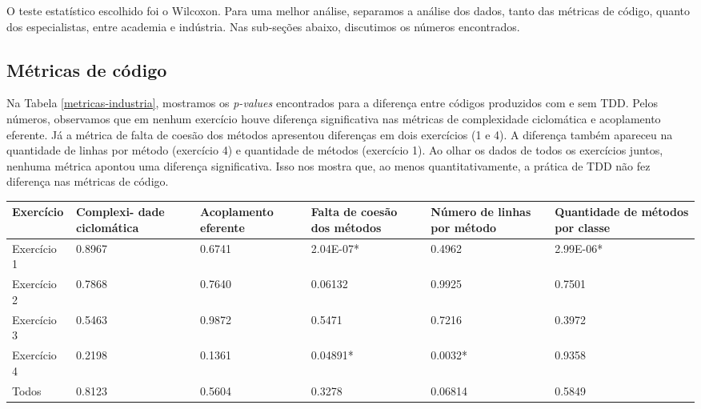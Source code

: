 \documentclass[conference]{IEEEtran}
\begin{document}
O teste estatístico escolhido foi o Wilcoxon. 
Para uma melhor análise, separamos a análise
dos dados, tanto das métricas de código, quanto dos especialistas, entre academia e indústria.
Nas sub-seções abaixo, discutimos os números encontrados.

\subsection{Métricas de código}

Na Tabela \ref{metricas-industria}, mostramos os \textit{p-values} encontrados para
a diferença entre códigos produzidos com e sem TDD. 
Pelos números, 
observamos que em nenhum exercício houve diferença significativa nas métricas
de complexidade ciclomática e acoplamento eferente. Já a métrica de falta
de coesão dos métodos apresentou diferenças em dois exercícios (1 e 4). 
A diferença também apareceu na quantidade de linhas por método (exercício 4)
e quantidade de métodos (exercício 1). Ao olhar os dados de todos os exercícios
juntos, nenhuma métrica apontou uma diferença significativa.
Isso nos mostra que, ao menos quantitativamente, a prática de TDD não fez
diferença nas métricas de código.

\begin{table*}
	\centering
	\begin{tabular}{ | p{3cm} | p{2cm} | p{2cm} | p{2cm} | p{2cm} | p{2cm} |}
		\hline
		Exercício & Complexi- dade ciclomática & Acoplamento eferente & Falta de coesão dos métodos & Número de linhas por método 
		& Quantidade de métodos por classe \\
		\hline
		Exercício 1 &	0.8967	&	0.6741 &	\cellcolor[gray]{0.8}2.04E-07* &	0.4962 &	\cellcolor[gray]{0.8}2.99E-06* \\
		Exercício 2	& 0.7868	&	0.7640 &	0.06132 &	0.9925 &	0.7501 \\
		Exercício 3	& 0.5463	&	0.9872 &	0.5471 &	0.7216 &	0.3972\\
		Exercício 4	& 0.2198	&	0.1361 &	\cellcolor[gray]{0.8}0.04891* &	\cellcolor[gray]{0.8}0.0032* &	0.9358\\
		\hline
		Todos &	0.8123	&	0.5604 &	0.3278 &	0.06814 &	0.5849\\
		\hline
	\end{tabular}
	\caption{\textit{P-values} encontrados para a diferença entre códigos com e sem TDD na indústria}
	\label{metricas-industria}
\end{table*}
\end{document}
